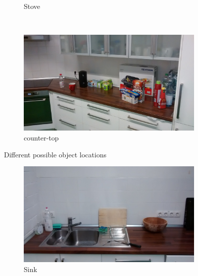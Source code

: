 \documentclass{article}
\begin{document}
{\begin{figure}
\begin{subfigure}[b]{0.3\textwidth}
        \caption{Stove}
        \label{fig:stove}
    \end{subfigure}
    ~ %
    \begin{subfigure}[b]{0.3\textwidth}
        \includegraphics[width=\textwidth]{images/counter-top.jpg}
        \caption{counter-top}
        \label{fig:counter-top}
    \end{subfigure}
    \caption{Different possible object locations}\label{fig:alllocations}
\end{figure}
\begin{figure}
    \centering
    \begin{subfigure}[b]{0.3\textwidth}
        \includegraphics[width=\textwidth]{images/sink.jpg}
        \caption{Sink}
        \label{fig:sink}
    \end{subfigure}
    ~ %
    \begin{subfigure}[b]{0.3\textwidth}

\end{subfigure}
\end{figure}}
\end{document}
